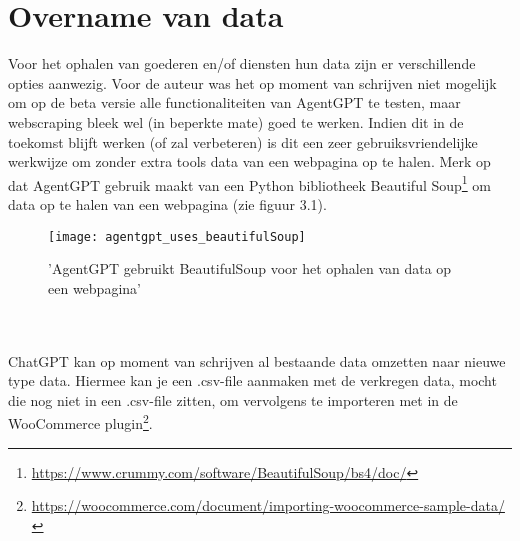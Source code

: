 \section{Overname van data}
Voor het ophalen van goederen en/of diensten hun data zijn er verschillende opties aanwezig. Voor de auteur was het op moment van schrijven niet mogelijk om op de beta versie alle functionaliteiten van AgentGPT te testen, maar webscraping bleek wel (in beperkte mate) goed te werken. Indien dit in de toekomst blijft werken (of zal verbeteren) is dit een zeer gebruiksvriendelijke werkwijze om zonder extra tools data van een webpagina op te halen. Merk op dat AgentGPT gebruik maakt van een Python bibliotheek Beautiful Soup\footnote{\href{https://www.crummy.com/software/BeautifulSoup/bs4/doc/}{https://www.crummy.com/software/BeautifulSoup/bs4/doc/}} om data op te halen van een webpagina (zie figuur 3.1). 
\begin{figure}
    \caption{'AgentGPT gebruikt BeautifulSoup voor het ophalen van data op een webpagina'}
    \begin{center}
        \texttt{[image: agentgpt\_uses\_beautifulSoup]}
    \end{center}
\end{figure} 
\\\\
ChatGPT kan op moment van schrijven al bestaande data omzetten naar nieuwe type data. Hiermee kan je een .csv-file aanmaken met de verkregen data, mocht die nog niet in een .csv-file zitten, om vervolgens te importeren met in de WooCommerce plugin\footnote{\href{https://woocommerce.com/document/importing-woocommerce-sample-data/}{https://woocommerce.com/document/importing-woocommerce-sample-data/}}.